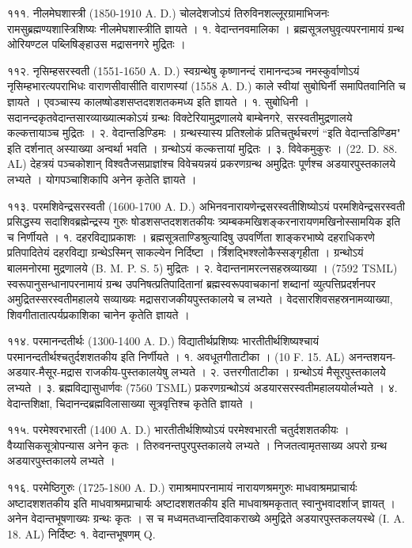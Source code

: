 १११. नीलमेघशास्त्री (1850-1910 A. D.)
चोलदेशजोऽयं तिरुविनशल्लूरग्रामाभिजनः रामसुब्रह्मण्यशास्त्रिशिष्यः नीलमेघशास्त्रीति ज्ञायते ।
१. वेदान्तनवमालिका । ब्रह्मसूत्रलघुवृत्यपरनामायं ग्रन्थ ओरियण्टल पब्लिषिङ्हाउस मद्रासनगरे मुद्रितः ।

११२. नृसिम्हसरस्वती (1551-1650 A. D.)
स्वग्रन्थेषु कृष्णानन्दं रामानन्दञ्च नमस्कुर्वाणोऽयं नृसिम्हभारत्यपराभिधः वाराणसीवासीति वाराणस्यां (1558 A. D.) काले स्वीयां सुबोघिर्नी समापितवानिति च ज्ञायते । एवञ्चास्य कालष्षोडशसप्तदशशतकमध्य इति ज्ञायते ।
१. सुबोधिनी । सदानन्दकृतवेदान्तसारव्याख्यात्मकोऽयं ग्रन्थः विक्टेरियामुद्रणालये बाम्बेनगरे, सरस्वतीमुद्रणालये कल्कत्तायाञ्च मुद्रितः ।
२. वेदान्तडिण्डिमः । ग्रन्थस्यास्य प्रतिश्लोकं प्रतिचतुर्थचरणं ``इति वेदान्तडिण्डिम" इति दर्शनात् अस्याख्या अन्वर्था भवति । ग्रन्थोऽयं कल्कत्तायां मुद्रितः ।
३. विवेकमुकुरः । (22. D. 88. AL) देहत्रयं पञ्चकोशान् विश्वतैजसप्राज्ञांश्च विवेचयन्नयं प्रकरणग्रन्थ अमुद्रितः पूर्णश्च अडयारपुस्तकालये लभ्यते । योगपञ्चाशिकापि अनेन कृतेति ज्ञायते ।

११३. परमशिवेन्द्रसरस्वती (1600-1700 A. D.)
अभिनवनारायणेन्द्रसरस्वतीशिष्योऽयं परमशिवेन्द्रसरस्वती प्रसिद्धस्य सदाशिवब्रह्मेन्द्रस्य गुरुः षोडशसप्तदशशतकीयः त्र्यम्बकमखिशङ्करनारायणमखिनोस्सामयिक इति च निर्णीयते ।
१. दहरविद्याप्रकाशः । ब्रह्मसूत्रताण्डिश्रुत्यादिषु उपवर्णिता शाङ्करभाष्ये दहराधिकरणे प्रतिपादितेयं दहरविद्या ग्रन्थेऽस्मिन् साकल्येन निर्दिष्टा । र्त्रिशद्भिश्श्लोकैस्सङ्गृहीता । ग्रन्थोऽयं बालमनोरमा मुद्रणालये (B. M. P. S. 5) मुद्रितः ।
२. वेदान्तनामरत्नसहस्रव्याख्या । (7592 TSML)
स्वरूपानुसन्धानापरनामायं ग्रन्थ उपनिषत्प्रतिपादितानां ब्रह्मस्वरूपवाचकानां शब्दानां व्युत्पत्तिप्रदर्शनपर अमुद्रितस्सरस्वतीमहालये सव्याख्यः मद्रासराजकीयपुस्तकालये च लभ्यते ।
वेदसारशिवसहस्रनामव्याख्या, शिवगीतातात्पर्यप्रकाशिका चानेन कृतेति ज्ञायते ।

११४. परमानन्दतीर्थः (1300-1400 A. D.)
विद्यातीर्थप्रशिष्यः भारतीतीर्थशिष्यश्चायं परमानन्दतीर्थश्चतुर्दशशतकीय इति निर्णीयते ।
१. अवधूतगीताटीका । (10 F. 15. AL) अनन्तशयन-अडयार-मैसूर-मद्रास राजकीय-पुस्तकालयेषु लभ्यते ।
२. उत्तरगीताटीका । ग्रन्थोऽयं मैसूरपुस्तकालयेे लभ्यते ।
३. ब्रह्मविद्यासुधार्णवः (7560 TSML) प्रकरणग्रन्थोऽयं अडयारसरस्वतीमहालययोर्लभ्यते ।
४. वेदान्तशिक्षा, चिदानन्दब्रह्मविलासाख्या सूत्रवृत्तिश्च कृतेति ज्ञायते ।

११५. परमेश्वरभारती (1400 A. D.)
भारतीतीर्थशिष्योऽयं परमेश्वभारती चतुर्दशशतकीयः । वैय्यासिकसूत्रोपन्यास अनेन कृतः । तिरुवनन्तपुरपुस्तकालये लभ्यते । निजतत्वामृतसाख्य अपरो ग्रन्थ अडयारपुस्तकालये लभ्यते ।

११६. परमेष्ठिगुरुः (1725-1800 A. D.)
रामाश्रमापरनामायं नारायणश्रमगुरुः माधवाश्रमप्राचार्यः अष्टादशशतकीय इति माधवाश्रमप्राचार्यः अष्टादशशतकीय इति माधवाश्रमकृतात् स्वानुभवादर्शाज् ज्ञायत् । अनेन वेदान्तभूषणाख्यः ग्रन्थः कृतः । स च मध्वमतध्वान्तदिवाकराख्ये अमुद्रिते अडयारपुस्तकलयस्थे (I. A. 18. AL) निर्दिष्टः
१. वेदान्तभूषणम् Q.


